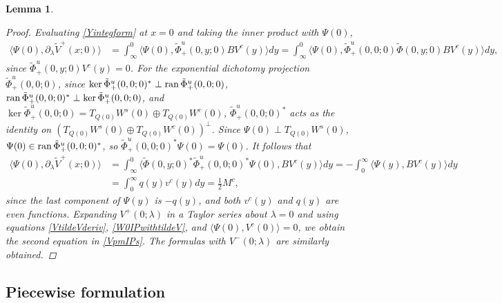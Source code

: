 \documentclass[10pt,reqno]{amsart}
\theoremstyle{plain}
\newtheorem{lemma}[theorem]{Lemma}
\theoremstyle{definition}
\theoremstyle{remark}
\numberwithin{theorem}{section}
\numberwithin{equation}{section}
\begin{document}
\begin{lemma}
\begin{proof}
Evaluating \cref{Yintegform} at $x = 0$ and taking the inner product with $\Psi(0)$, 
\begin{align*}
\langle \Psi(0), \partial_\lambda \tilde{V}^+(x; 0)  \rangle
&= \int_{\infty}^0 \langle \Psi(0), \tilde{\Phi}_+^u(0,y; 0) B V^c(y) \rangle dy
= \int_{\infty}^0 \langle \Psi(0), \tilde{\Phi}_+^u(0,0; 0) \tilde{\Phi}(0,y; 0) B V^c(y) \rangle dy,
\end{align*}
since $\tilde{\Phi}_+^u(0,y; 0) V^c(y) = 0$. For the exponential dichotomy projection $\tilde{\Phi}_+^u(0,0; 0)$, since $\mathop\mathrm{ker}\nolimits \tilde{\Phi}_+^u(0, 0; 0)^* \perp \operatorname{ran} \tilde{\Phi}_+^u(0, 0; 0)$, $\operatorname{ran} \tilde{\Phi}_+^u(0, 0; 0)^* \perp \mathop\mathrm{ker}\nolimits \tilde{\Phi}_+^u(0, 0; 0)$, and $\ker \tilde{\Phi}_+^u(0, 0; 0) = T_{Q(0)} W^s(0) \oplus T_{Q(0)} W^c(0)$, $\tilde{\Phi}_+^u(0, 0; 0)^*$ acts as the identity on $(T_{Q(0)} W^s(0) \oplus T_{Q(0)} W^c(0))^\perp$. Since $\Psi(0) \perp T_{Q(0)} W^s(0)$, $\Psi(0) \in \operatorname{ran} \tilde{\Phi}_+^u(0, 0; 0)^*$, so $\tilde{\Phi}_+^u(0, 0; 0)^* \Psi(0) = \Psi(0)$. It follows that
\begin{align*}
\langle \Psi(0), \partial_\lambda \tilde{V}^+(x; 0)  \rangle
&= \int_{\infty}^0 \langle \tilde{\Phi}(0,y; 0)^* \tilde{\Phi}_+^u(0,0; 0)^* \Psi(0), B V^c(y) \rangle dy = -\int_0^\infty \langle \Psi(y), B V^c(y) \rangle dy \\
&= \int_0^\infty q(y) v^c(y) dy = \frac{1}{2}M^c,
\end{align*}
since the last component of $\Psi(y)$ is $-q(y)$, and both $v^c(y)$ and $q(y)$ are even functions. Expanding $V^+(0; \lambda)$ in a Taylor series about $\lambda = 0$ and using equations \cref{VtildeVderiv}, \cref{W0IPwithtildeV}, and $\langle \Psi(0), V^c(0)\rangle = 0$, we obtain the second equation in \cref{VpmIPs}. The formulas with $V^-(0; \lambda)$ are similarly obtained.
\end{proof}
\end{lemma}

\subsection{Piecewise formulation}
\end{document}
